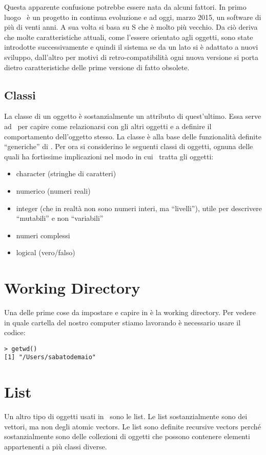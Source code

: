 Questa apparente confusione potrebbe essere nata da alcuni fattori. In primo luogo \erre\ è un progetto in continua evoluzione e ad oggi, marzo 2015, un software di più di venti anni. A sua volta si basa su S che è molto più vecchio. Da ciò deriva che molte caratteristiche attuali, come l'essere orientato agli oggetti, sono state introdotte successivamente e quindi il sistema se da un lato si è adattato a nuovi sviluppo, dall'altro per motivi di retro-compatibilità ogni nuova versione si porta dietro caratteristiche delle prime versione di fatto obsolete.




\subsection{Classi}

La classe di un oggetto è sostanzialmente un attributo di quest'ultimo. Essa serve ad \erre\ per capire come relazionarsi con gli altri oggetti e a definire il comportamento dell'oggetto stesso. La classe è alla base delle funzionalità definite ``generiche''  di \erre.
%
Per ora si considerino le seguenti classi di oggetti, ognuna delle quali ha fortissime implicazioni nel modo in cui \erre\ tratta gli oggetti:

\begin{itemize}
\item character (stringhe di caratteri)
\item numerico (numeri reali)
\item integer (che in realtà non sono numeri interi, ma ``livelli''), utile per descrivere ``mutabili'' e non ``variabili''
\item numeri complessi
\item logical (vero/falso)
\end{itemize}

\section{Working Directory}

Una delle prime cose da impostare e capire in \erre è la working directory. Per vedere in quale cartella del nostro computer stiamo lavorando è necessario usare il codice:
\begin{lstlisting}
> getwd()
[1] "/Users/sabatodemaio"
\end{lstlisting}


\section{List}
Un altro tipo di oggetti usati in \erre\ sono le list. Le list sostanzialmente sono dei vettori, ma non degli atomic vectors. Le list sono definite recursive vectors perché sostanzialmente sono delle collezioni di oggetti che possono contenere elementi appartenenti a più classi diverse.

